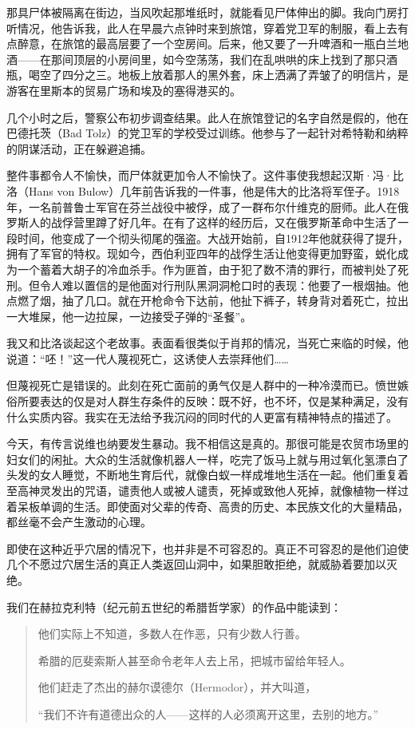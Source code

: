 \documentclass[UTF8]{ctexart}
\begin{document}
那具尸体被隔离在街边，当风吹起那堆纸时，就能看见尸体伸出的脚。我向门房打听情况，他告诉我，此人在早晨六点钟时来到旅馆，穿着党卫军的制服，看上去有点醉意，在旅馆的最高层要了一个空房间。后来，他又要了一升啤酒和一瓶白兰地酒——在那间顶层的小房间里，如今空荡荡，我们在乱哄哄的床上找到了那只酒瓶，喝空了四分之三。地板上放着那人的黑外套，床上洒满了弄皱了的明信片，是游客在里斯本的贸易广场和埃及的塞得港买的。

几个小时之后，警察公布初步调查结果。此人在旅馆登记的名字自然是假的，他在巴德托茨（Bad Tolz）的党卫军的学校受过训练。他参与了一起针对希特勒和纳粹的阴谋活动，正在躲避追捕。

整件事都令人不愉快，而尸体就更加令人不愉快了。这件事使我想起汉斯·冯·比洛（Hans von Bulow）几年前告诉我的一件事，他是伟大的比洛将军侄子。1918年，一名前普鲁士军官在芬兰战役中被俘，成了一群布尔什维克的厨师。此人在俄罗斯人的战俘营里蹲了好几年。在有了这样的经历后，又在俄罗斯革命中生活了一段时间，他变成了一个彻头彻尾的强盗。大战开始前，自1912年他就获得了提升，拥有了军官的特权。现如今，西伯利亚四年的战俘生活让他变得更加野蛮，蜕化成为一个蓄着大胡子的冷血杀手。作为匪首，由于犯了数不清的罪行，而被判处了死刑。但令人难以置信的是他面对行刑队黑洞洞枪口时的表现：他要了一根烟抽。他点燃了烟，抽了几口。就在开枪命令下达前，他扯下裤子，转身背对着死亡，拉出一大堆屎，他一边拉屎，一边接受子弹的“圣餐”。

我又和比洛谈起这个老故事。表面看很类似于肖邦的情况，当死亡来临的时候，他说道：“呸！”这一代人蔑视死亡，这诱使人去崇拜他们……

但蔑视死亡是错误的。此刻在死亡面前的勇气仅是人群中的一种冷漠而已。愤世嫉俗所要表达的仅是对人群生存条件的反映：既不好，也不坏，仅是某种满足，没有什么实质内容。我实在无法给予我沉闷的同时代的人更富有精神特点的描述了。

今天，有传言说维也纳要发生暴动。我不相信这是真的。那很可能是农贸市场里的妇女们的闲扯。大众的生活就像机器人一样，吃完了饭马上就与用过氧化氢漂白了头发的女人睡觉，不断地生育后代，就像白蚁一样成堆地生活在一起。他们重复着至高神灵发出的咒语，谴责他人或被人谴责，死掉或致他人死掉，就像植物一样过着呆板单调的生活。即使面对父辈的传奇、高贵的历史、本民族文化的大量精品，都丝毫不会产生激动的心理。

即使在这种近乎穴居的情况下，也并非是不可容忍的。真正不可容忍的是他们迫使几个不愿过穴居生活的真正人类返回山洞中，如果胆敢拒绝，就威胁着要加以灭绝。

我们在赫拉克利特（纪元前五世纪的希腊哲学家）的作品中能读到：

\begin{quote}
他们实际上不知道，多数人在作恶，只有少数人行善。

希腊的厄斐索斯人甚至命令老年人去上吊，把城市留给年轻人。

他们赶走了杰出的赫尔谟德尔（Hermodor），并大叫道，

“我们不许有道德出众的人——这样的人必须离开这里，去别的地方。”
\end{quote}
\end{document}
